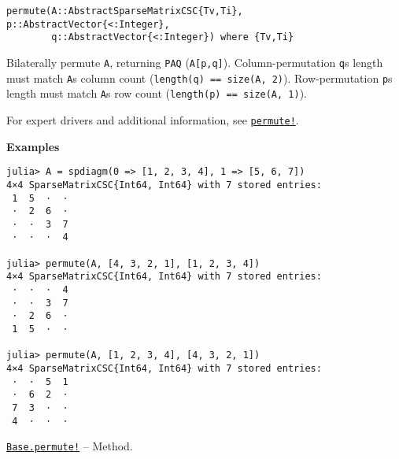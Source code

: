 \begin{adjustwidth}{2em}{0pt}


\begin{verbatim}
permute(A::AbstractSparseMatrixCSC{Tv,Ti}, p::AbstractVector{<:Integer},
        q::AbstractVector{<:Integer}) where {Tv,Ti}
\end{verbatim}

Bilaterally permute \texttt{A}, returning \texttt{PAQ} (\texttt{A[p,q]}). Column-permutation \texttt{q}{\textquotesingle}s length must match \texttt{A}{\textquotesingle}s column count (\texttt{length(q) == size(A, 2)}). Row-permutation \texttt{p}{\textquotesingle}s length must match \texttt{A}{\textquotesingle}s row count (\texttt{length(p) == size(A, 1)}).

For expert drivers and additional information, see \hyperlink{17656204056022557287}{\texttt{permute!}}.

\textbf{Examples}


\begin{verbatim}
julia> A = spdiagm(0 => [1, 2, 3, 4], 1 => [5, 6, 7])
4×4 SparseMatrixCSC{Int64, Int64} with 7 stored entries:
 1  5  ⋅  ⋅
 ⋅  2  6  ⋅
 ⋅  ⋅  3  7
 ⋅  ⋅  ⋅  4

julia> permute(A, [4, 3, 2, 1], [1, 2, 3, 4])
4×4 SparseMatrixCSC{Int64, Int64} with 7 stored entries:
 ⋅  ⋅  ⋅  4
 ⋅  ⋅  3  7
 ⋅  2  6  ⋅
 1  5  ⋅  ⋅

julia> permute(A, [1, 2, 3, 4], [4, 3, 2, 1])
4×4 SparseMatrixCSC{Int64, Int64} with 7 stored entries:
 ⋅  ⋅  5  1
 ⋅  6  2  ⋅
 7  3  ⋅  ⋅
 4  ⋅  ⋅  ⋅
\end{verbatim}



\end{adjustwidth}
\hypertarget{17776927329794393248}{}
\hyperlink{17776927329794393248}{\texttt{Base.permute!}}  -- {Method.}


